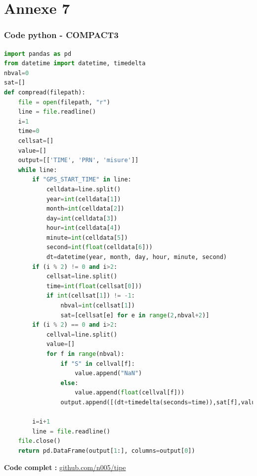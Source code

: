 \documentclass[xcolor=dvipsnames,envcountsect]{beamer}
\begin{document}
\section{Annexe 7}
\begin{frame}
	\frametitle{Code python - COMPACT3}
	\noindent
	\begin{lstlisting}[language=Python,basicstyle=\tiny]
import pandas as pd
from datetime import datetime, timedelta
nbval=0
sat=[]
def compread(filepath):
	file = open(filepath, "r")
	line = file.readline()
	i=1
	time=0
	cellsat=[]
	value=[]
	output=[['TIME', 'PRN', 'misure']]
	while line:
		if "GPS_START_TIME" in line:
			celldata=line.split()
			year=int(celldata[1])
			month=int(celldata[2])
			day=int(celldata[3])
			hour=int(celldata[4])
			minute=int(celldata[5])
			second=int(float(celldata[6]))
			dt=datetime(year, month, day, hour, minute, second)
		if (i % 2) != 0 and i>2:
			cellsat=line.split()
			time=int(float(cellsat[0]))
			if int(cellsat[1]) != -1:
				nbval=int(cellsat[1])
				sat=[cellsat[e] for e in range(2,nbval+2)]
		if (i % 2) == 0 and i>2:
			cellval=line.split()
			value=[]
			for f in range(nbval):
				if "S" in cellval[f]:
					value.append("NaN")
				else:
					value.append(float(cellval[f]))
				output.append([(dt+timedelta(seconds=time)),sat[f],value[f]])
		
		i=i+1
		line = file.readline()
	file.close()   
	return pd.DataFrame(output[1:], columns=output[0])
	\end{lstlisting}
	\textbf{Code complet :} \url{github.com/n005/tipe}
\end{frame}
\end{document}
